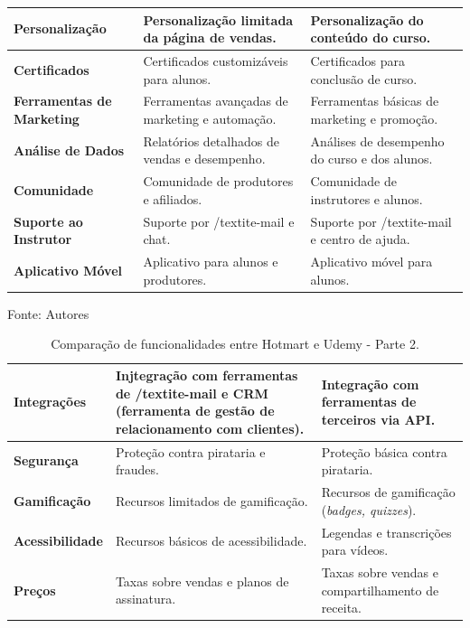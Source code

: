 \begin{apendicesenv}
\begin{table}[h]
\begin{adjustbox}{width=\textwidth}
\begin{tabular}{|p{5cm}|p{5cm}|p{5cm}|}
        \hline
        \textbf{Personalização} & Personalização limitada da página de vendas. & Personalização do conteúdo do curso. \\
        \hline
        \textbf{Certificados} & Certificados customizáveis para alunos. & Certificados para conclusão de curso. \\
        \hline
        \textbf{Ferramentas de Marketing} & Ferramentas avançadas de marketing e automação. & Ferramentas básicas de marketing e promoção. \\
        \hline
        \textbf{Análise de Dados} & Relatórios detalhados de vendas e desempenho. & Análises de desempenho do curso e dos alunos. \\
        \hline
        \textbf{Comunidade} & Comunidade de produtores e afiliados. & Comunidade de instrutores e alunos. \\
        \hline
        \textbf{Suporte ao Instrutor} & Suporte por /textit{e-mail} e chat. & Suporte por /textit{e-mail} e centro de ajuda. \\
        \hline
        \textbf{Aplicativo Móvel} & Aplicativo para alunos e produtores. & Aplicativo móvel para alunos. \\
        \hline
    \end{tabular}
    \end{adjustbox}

    \vspace{5mm}
    {\footnotesize Fonte: Autores} 

\end{table}

\begin{table}[h]
    \centering
    \caption{Comparação de funcionalidades entre Hotmart e Udemy - Parte 2.}
    \label{tab:comparacao_hotmart_udemy2}
    \begin{adjustbox}{width=\textwidth}
    \begin{tabular}{|p{5cm}|p{5cm}|p{5cm}|}
\hline
\textbf{Integrações} & Injtegração com ferramentas de /textit{e-mail} e CRM (ferramenta de gestão de relacionamento com clientes). & Integração com ferramentas de terceiros via API. \\
\hline
\textbf{Segurança} & Proteção contra pirataria e fraudes. & Proteção básica contra pirataria. \\
\hline
\textbf{Gamificação} & Recursos limitados de gamificação. & Recursos de gamificação (\textit{badges, quizzes}). \\
\hline
\textbf{Acessibilidade} & Recursos básicos de acessibilidade. & Legendas e transcrições para vídeos. \\
\hline
\textbf{Preços} & Taxas sobre vendas e planos de assinatura. & Taxas sobre vendas e compartilhamento de receita. \\
\hline
\end{tabular}
\end{adjustbox}


\end{table}
\end{apendicesenv}
